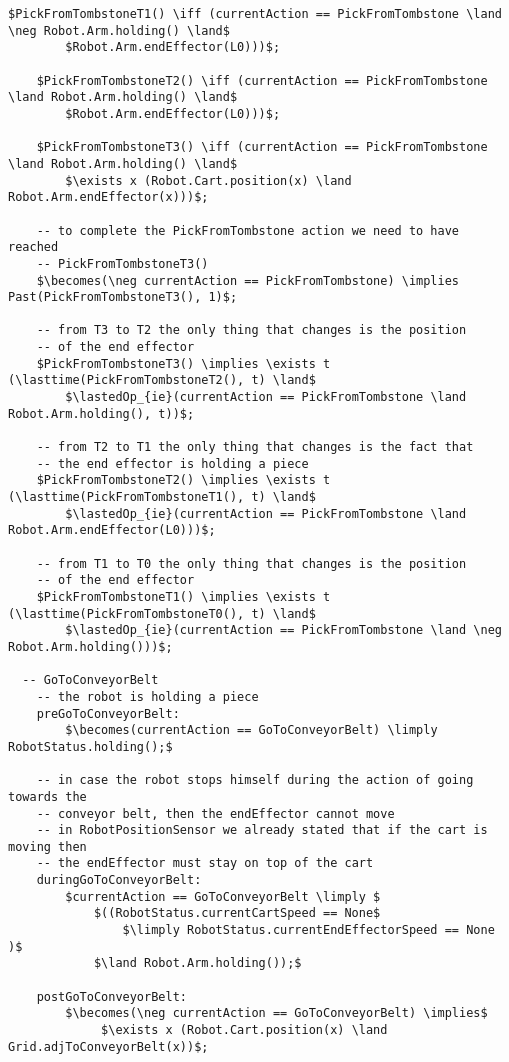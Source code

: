 \begin{lstlisting}[fontadjust, mathescape, frame=single]
    $PickFromTombstoneT1() \iff (currentAction == PickFromTombstone \land \neg Robot.Arm.holding() \land$
        $Robot.Arm.endEffector(L0)))$;
    
    $PickFromTombstoneT2() \iff (currentAction == PickFromTombstone \land Robot.Arm.holding() \land$
        $Robot.Arm.endEffector(L0)))$;
    
    $PickFromTombstoneT3() \iff (currentAction == PickFromTombstone \land Robot.Arm.holding() \land$
        $\exists x (Robot.Cart.position(x) \land Robot.Arm.endEffector(x)))$;
    
    -- to complete the PickFromTombstone action we need to have reached
    -- PickFromTombstoneT3()
    $\becomes(\neg currentAction == PickFromTombstone) \implies Past(PickFromTombstoneT3(), 1)$;
    
    -- from T3 to T2 the only thing that changes is the position
    -- of the end effector
    $PickFromTombstoneT3() \implies \exists t (\lasttime(PickFromTombstoneT2(), t) \land$
        $\lastedOp_{ie}(currentAction == PickFromTombstone \land Robot.Arm.holding(), t))$;

    -- from T2 to T1 the only thing that changes is the fact that
    -- the end effector is holding a piece
    $PickFromTombstoneT2() \implies \exists t (\lasttime(PickFromTombstoneT1(), t) \land$
        $\lastedOp_{ie}(currentAction == PickFromTombstone \land Robot.Arm.endEffector(L0)))$;
    
    -- from T1 to T0 the only thing that changes is the position
    -- of the end effector
    $PickFromTombstoneT1() \implies \exists t (\lasttime(PickFromTombstoneT0(), t) \land$
        $\lastedOp_{ie}(currentAction == PickFromTombstone \land \neg Robot.Arm.holding()))$;

  -- GoToConveyorBelt
    -- the robot is holding a piece
    preGoToConveyorBelt:
        $\becomes(currentAction == GoToConveyorBelt) \limply RobotStatus.holding();$
    
    -- in case the robot stops himself during the action of going towards the 
    -- conveyor belt, then the endEffector cannot move 
    -- in RobotPositionSensor we already stated that if the cart is moving then 
    -- the endEffector must stay on top of the cart
    duringGoToConveyorBelt:
        $currentAction == GoToConveyorBelt \limply $
            $((RobotStatus.currentCartSpeed == None$ 
                $\limply RobotStatus.currentEndEffectorSpeed == None )$
            $\land Robot.Arm.holding());$

    postGoToConveyorBelt:
        $\becomes(\neg currentAction == GoToConveyorBelt) \implies$
             $\exists x (Robot.Cart.position(x) \land Grid.adjToConveyorBelt(x))$;
      

\end{lstlisting}
